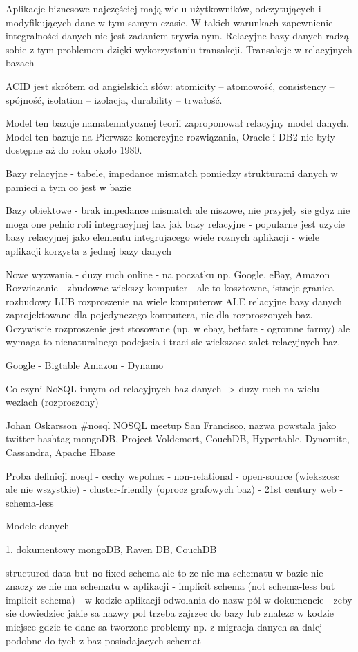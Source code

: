 Aplikacje biznesowe najczęściej mają wielu użytkowników, odczytujących i modyfikujących dane w tym samym czasie. W takich warunkach zapewnienie integralności danych nie jest zadaniem trywialnym. Relacyjne bazy danych radzą sobie z tym problemem dzięki wykorzystaniu transakcji. Transakcje w relacyjnych bazach 

 ACID jest skrótem od angielskich słów: atomicity – atomowość, consistency – spójność, isolation – izolacja, durability – trwałość.

Model ten bazuje namatematycznej teorii zaproponował relacyjny model danych. Model ten bazuje na  Pierwsze komercyjne rozwiązania, Oracle i DB2 nie były dostępne aż do roku około 1980.


Bazy relacyjne - tabele, impedance mismatch pomiedzy strukturami danych w pamieci a tym co jest w bazie

Bazy obiektowe - brak impedance mismatch ale niszowe, nie przyjely sie gdyz nie moga one pelnic roli integracyjnej tak jak bazy relacyjne - popularne jest uzycie bazy relacyjnej jako elementu integrujacego wiele roznych aplikacji - wiele aplikacji korzysta z jednej bazy danych

Nowe wyzwania - duzy ruch online - na poczatku np. Google, eBay, Amazon
Rozwiazanie - zbudowac wiekszy komputer - ale to kosztowne, istneje granica rozbudowy LUB rozproszenie na wiele komputerow ALE relacyjne
bazy danych zaprojektowane dla pojedynczego komputera, nie dla rozproszonych baz. Oczywiscie rozproszenie jest stosowane (np. w ebay, betfare - ogromne farmy) ale wymaga to nienaturalnego podejscia i traci sie wiekszosc zalet relacyjnych baz.

Google - Bigtable
Amazon - Dynamo

Co czyni NoSQL innym od relacyjnych baz danych -> duzy ruch na wielu wezlach (rozproszony)

Johan Oskarsson \#nosql NOSQL meetup San Francisco, nazwa powstala jako twitter hashtag
mongoDB, Project Voldemort, CouchDB, Hypertable, Dynomite, Cassandra, Apache Hbase

Proba definicji nosql - cechy wspolne:
- non-relational
- open-source (wiekszosc ale nie wszystkie)
- cluster-friendly (oprocz grafowych baz)
- 21st century web
- schema-less


Modele danych

1. dokumentowy
mongoDB, Raven DB, CouchDB

structured data but no fixed schema
ale to ze nie ma schematu w bazie nie znaczy ze nie ma schematu w aplikacji
- implicit schema (not schema-less but implicit schema) - w kodzie aplikacji
odwolania do nazw pól w dokumencie - zeby sie dowiedziec jakie sa nazwy pol trzeba
zajrzec do bazy lub znalezc w kodzie miejsce gdzie te dane sa tworzone
problemy np. z migracja danych sa dalej podobne do tych z baz posiadajacych schemat


